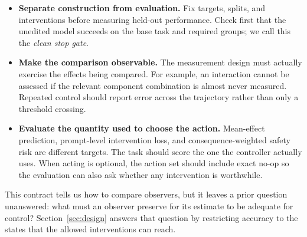 \begin{itemize}[leftmargin=1.5em,itemsep=0.2em,topsep=0.3em]
  \item \textbf{Separate construction from evaluation.} Fix targets, splits,
  and interventions before measuring held-out performance. Check first that
  the unedited model succeeds on the base task and required groups; we call
  this the \emph{clean stop gate}.

  \item \textbf{Make the comparison observable.} The measurement design must
  actually exercise the effects being compared. For example, an interaction
  cannot be assessed if the relevant component combination is almost never
  measured. Repeated control should report error across the trajectory rather
  than only a threshold crossing.

  \item \textbf{Evaluate the quantity used to choose the action.} Mean-effect
  prediction, prompt-level intervention loss, and consequence-weighted safety
  risk are different targets. The task should score the one the controller
  actually uses. When acting is optional, the action set should include exact
  no-op so the evaluation can also ask whether any intervention is worthwhile.
\end{itemize}

This contract tells us how to compare observers, but it leaves a prior
question unanswered: what must an observer preserve for its estimate to be
adequate for control? Section~\ref{sec:design} answers that question by
restricting accuracy to the states that the allowed interventions can reach.
